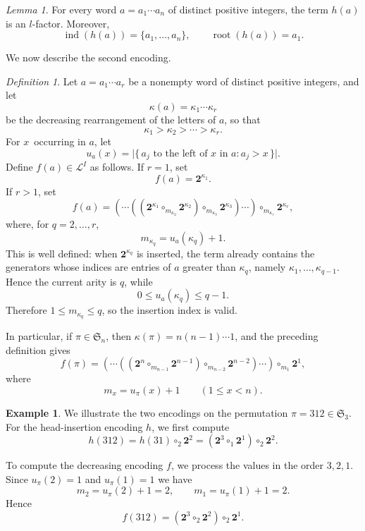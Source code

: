 \documentclass[a4paper]{article}
\theoremstyle{plain}
\theoremstyle{definition}
\newtheorem{exm}{Example}[section]
\theoremstyle{remark}
\numberwithin{equation}{section}
\renewcommand{\le}{\leqslant}\renewcommand{\ge}{\geqslant}
\newcommand{\Sym}{\mathfrak{S}}
\newtheorem{lemma}[theorem]{Lemma}
\newtheorem{definition}[theorem]{Definition}
\begin{document}
\begin{lemma}\label{lem:h-is-lfactor}
For every word $a=a_1\cdots a_n$ of distinct positive integers, the term \(h(a)\) is an \(l\)-factor. Moreover,
\[
\operatorname{ind}(h(a))=\{a_1,\dots,a_n\},
\qquad
\operatorname{root}(h(a))=a_1.
\]
\end{lemma}

We now describe the second encoding.
\begin{definition}\label{def:decreasing-encoding}
Let \(a=a_1\cdots a_r\) be a nonempty word of distinct positive integers, and
let
\[
\kappa(a)=\kappa_1\cdots\kappa_r
\]
be the decreasing rearrangement of the letters of \(a\), so that
\[
\kappa_1>\kappa_2>\cdots>\kappa_r.
\]
For $x$\ occurring in $a$, let
\[
u_a(x)=
\bigl|\{\,a_j \text{ to the left of } x \text{ in } a : a_j>x\,\}\bigr|.
\]
Define \(f(a)\in\mathcal L^I\) as follows. If \(r=1\), set
\[
f(a)=\mathbf 2^{\kappa_1}.
\]
If \(r>1\), set
\[
f(a)
=
(\cdots((\mathbf 2^{\kappa_1}\circ_{m_{\kappa_2}}\mathbf 2^{\kappa_2})
\circ_{m_{\kappa_3}}\mathbf 2^{\kappa_3})\cdots)
\circ_{m_{\kappa_r}}\mathbf 2^{\kappa_r},
\]
where, for \(q=2,\dots,r\),
\[
m_{\kappa_q}=u_a(\kappa_q)+1.
\]
This is well defined: when \(\mathbf 2^{\kappa_q}\) is inserted, the term
already contains the generators whose indices are entries of \(a\)
greater than \(\kappa_q\), namely \(\kappa_1,\dots,\kappa_{q-1}\). Hence the
current arity is \(q\), while
\[
0\le u_a(\kappa_q)\le q-1.
\]
Therefore $1\le m_{\kappa_q}\le q$, so the insertion index is valid.
\end{definition}

In particular, if \(\pi\in\Sym_n\), then \(\kappa(\pi)=n(n-1)\cdots1\), and
the preceding definition gives
\[
f(\pi)
=
(\cdots((\mathbf 2^n\circ_{m_{n-1}}\mathbf 2^{n-1})
\circ_{m_{n-2}}\mathbf 2^{n-2})\cdots)\circ_{m_1}\mathbf 2^1,
\]
where
\[
m_x=u_\pi(x)+1
\qquad (1\le x<n).
\]

\begin{exm}
We illustrate the two encodings on the permutation \(\pi=312\in\Sym_3\). For the head-insertion encoding \(h\), we first compute
\[
h(312)=h(31)\circ_2\mathbf 2^2=(\mathbf 2^3\circ_1 \mathbf 2^1)\circ_2 \mathbf 2^2.
\]

To compute the decreasing encoding \(f\), we process the values in the order \(3,2,1\). Since $u_\pi(2)=1$ and $u_\pi(1)=1$ we have
\[
m_2=u_\pi(2)+1=2,
\qquad
m_1=u_\pi(1)+1=2.
\]
Hence
\[
f(312)=(\mathbf 2^3\circ_2 \mathbf 2^2)\circ_2 \mathbf 2^1.
\]
\end{exm}
\end{document}
